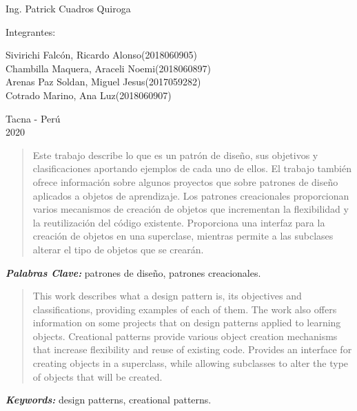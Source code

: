 \documentclass{article}
\providecommand{\keywords}[1]{
  \small	
  \textbf{\textit{\quad \quad Keywords: }} #1}
\providecommand{\pclave}[1]{
  \small	
  \textbf{\textit{\quad \quad Palabras Clave: }} #1}
\begin{document}
\begin{titlepage}
\begin{center}
\vspace*{0.1in}
\begin{large}
 Ing. Patrick Cuadros Quiroga\\
\end{large}

\vspace*{0.2in}
\vspace*{0.1in}
\begin{large}

Integrantes: \\
\begin{flushleft}
Sivirichi Falcón, Ricardo Alonso\hfill(2018060905) \\
Chambilla Maquera, Araceli Noemi\hfill(2018060897)\\
Arenas Paz Soldan, Miguel Jesus\hfill(2017059282)\\
Cotrado Marino, Ana Luz\hfill(2018060907)\\

\end{flushleft}
\end{large}

\vspace*{0.1in}
\begin{large}
Tacna - Perú\\
2020
\end{large}
\end{center}
\end{titlepage}

\begin{abstract}
\quad Este trabajo describe lo que es un patrón de diseño, sus objetivos y clasificaciones aportando ejemplos de cada uno de ellos. El trabajo también ofrece información sobre algunos proyectos que sobre patrones de diseño aplicados a objetos de aprendizaje. Los patrones creacionales proporcionan varios mecanismos de creación de objetos que incrementan la flexibilidad y la reutilización del código existente. Proporciona una interfaz para la creación de objetos en una superclase, mientras permite a las subclases alterar el tipo de objetos que se crearán.

\end{abstract}
\pclave{patrones de diseño, patrones creacionales.}

\begin{abstract}
\quad This work describes what a design pattern is, its objectives and classifications, providing examples of each of them. The work also offers information on some projects that on design patterns applied to learning objects. Creational patterns provide various object creation mechanisms that increase flexibility and reuse of existing code. Provides an interface for creating objects in a superclass, while allowing subclasses to alter the type of objects that will be created.

\end{abstract}
\keywords{design patterns, creational patterns.}
\end{document}
